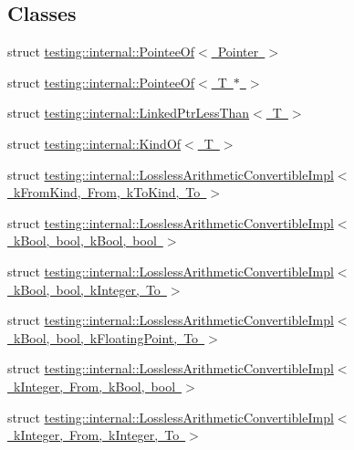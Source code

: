 \subsection*{Classes}
\begin{DoxyCompactItemize}
\item 
struct \mbox{\hyperlink{structtesting_1_1internal_1_1_pointee_of}{testing\+::internal\+::\+Pointee\+Of$<$ Pointer $>$}}
\item 
struct \mbox{\hyperlink{structtesting_1_1internal_1_1_pointee_of_3_01_t_01_5_01_4}{testing\+::internal\+::\+Pointee\+Of$<$ T $\ast$ $>$}}
\item 
struct \mbox{\hyperlink{structtesting_1_1internal_1_1_linked_ptr_less_than}{testing\+::internal\+::\+Linked\+Ptr\+Less\+Than$<$ T $>$}}
\item 
struct \mbox{\hyperlink{structtesting_1_1internal_1_1_kind_of}{testing\+::internal\+::\+Kind\+Of$<$ T $>$}}
\item 
struct \mbox{\hyperlink{structtesting_1_1internal_1_1_lossless_arithmetic_convertible_impl}{testing\+::internal\+::\+Lossless\+Arithmetic\+Convertible\+Impl$<$ k\+From\+Kind, From, k\+To\+Kind, To $>$}}
\item 
struct \mbox{\hyperlink{structtesting_1_1internal_1_1_lossless_arithmetic_convertible_impl_3_01k_bool_00_01bool_00_01k_bool_00_01bool_01_4}{testing\+::internal\+::\+Lossless\+Arithmetic\+Convertible\+Impl$<$ k\+Bool, bool, k\+Bool, bool $>$}}
\item 
struct \mbox{\hyperlink{structtesting_1_1internal_1_1_lossless_arithmetic_convertible_impl_3_01k_bool_00_01bool_00_01k_integer_00_01_to_01_4}{testing\+::internal\+::\+Lossless\+Arithmetic\+Convertible\+Impl$<$ k\+Bool, bool, k\+Integer, To $>$}}
\item 
struct \mbox{\hyperlink{structtesting_1_1internal_1_1_lossless_arithmetic_convertible_impl_3_01k_bool_00_01bool_00_01k_floating_point_00_01_to_01_4}{testing\+::internal\+::\+Lossless\+Arithmetic\+Convertible\+Impl$<$ k\+Bool, bool, k\+Floating\+Point, To $>$}}
\item 
struct \mbox{\hyperlink{structtesting_1_1internal_1_1_lossless_arithmetic_convertible_impl_3_01k_integer_00_01_from_00_01k_bool_00_01bool_01_4}{testing\+::internal\+::\+Lossless\+Arithmetic\+Convertible\+Impl$<$ k\+Integer, From, k\+Bool, bool $>$}}
\item 
struct \mbox{\hyperlink{structtesting_1_1internal_1_1_lossless_arithmetic_convertible_impl_3_01k_integer_00_01_from_00_01k_integer_00_01_to_01_4}{testing\+::internal\+::\+Lossless\+Arithmetic\+Convertible\+Impl$<$ k\+Integer, From, k\+Integer, To $>$}}

\end{DoxyCompactItemize}
